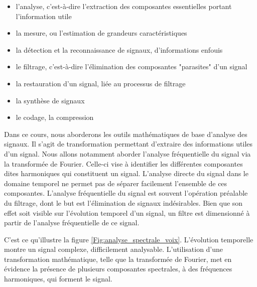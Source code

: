 	\begin{itemize}
		\item l'analyse, c'est-à-dire l'extraction des composantes essentielles portant l'information utile
		\item la mesure, ou l'estimation de grandeurs caractéristiques
		\item la détection et la reconnaissance de signaux, d'informations enfouis
		\item le filtrage, c'est-à-dire l'élimination des composantes "parasites" d'un signal
		\item la restauration d'un signal, liée au processus de filtrage
		\item la synthèse de signaux
		\item le codage, la compression
	\end{itemize}
	
	
	
	Dans ce cours, nous aborderons les outils mathématiques de base d'analyse des signaux. Il s'agit de transformation permettant d'extraire des informations utiles d'un signal. Nous allons notamment aborder l'analyse fréquentielle du signal via la transformée de Fourier. Celle-ci vise à identifier les différentes composantes dites harmoniques qui constituent un signal. L'analyse directe du signal dans le domaine temporel ne permet pas de séparer facilement l'ensemble de ces composantes. L'analyse fréquentielle du signal est souvent l'opération préalable du filtrage, dont le but est l'élimination de signaux indésirables. Bien que son effet soit visible sur l'évolution temporel d'un signal, un filtre est dimensionné à partir de l'analyse fréquentielle de ce signal.
	
	C'est ce qu'illustre la figure \ref{Fig:analyse_spectrale_voix}. L'évolution temporelle montre un signal complexe, difficilement analysable. L'utilisation d'une transformation mathématique, telle que la transformée de Fourier, met en évidence la présence de plusieurs composantes spectrales, à des fréquences harmoniques, qui forment le signal.
	
